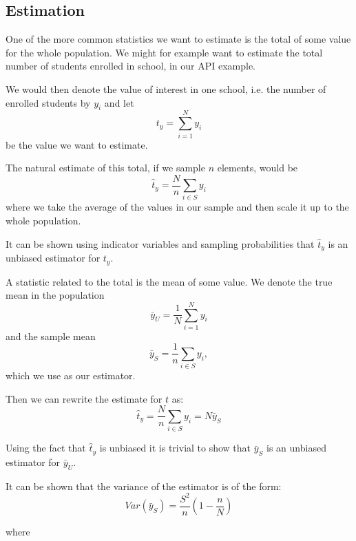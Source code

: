 \documentclass{article}
\begin{document}
\subsection{Estimation}

One of the more common statistics we want to estimate is the total of some value
for the whole population. We might for example want to estimate the total number
of students enrolled in school, in our API example.

We would then denote the value of interest in one school, i.e. the number of
enrolled students by \(y_i\) and let
\begin{equation*}
  t_y = \sum_{i = 1}^{N} y_i
\end{equation*}
be the value we want to estimate.

The natural estimate of this total, if we sample \(n\) elements, would be
\begin{equation*}
\hat{t}_y = \frac{N}{n}\sum_{i \in S} y_i
\end{equation*}
where we take the average of the values in our sample and then scale it up to
the whole population.

It can be shown using indicator variables and sampling probabilities that
\(\hat{t}_y\) is an unbiased estimator for \(t_y\).


A statistic related to the total is the mean of some value. We denote the true
mean in the population
\begin{equation*}
\bar{y}_U = \frac{1}{N} \sum_{i = 1}^{N} y_i
\end{equation*}
and the sample mean
\begin{equation*}
\bar{y}_S = \frac{1}{n} \sum_{i \in S} y_i ,
\end{equation*}
which we use as our estimator.

Then we can rewrite the estimate for \(t\) as:
\begin{equation*}
\hat{t}_y = \frac{N}{n} \sum_{i \in S} y_i = N\bar{y}_S
\end{equation*}

Using the fact that \(\hat{t}_y\) is unbiased it is trivial to show that
\(\bar{y}_S\) is an unbiased estimator for \(\bar{y}_U\).

It can be shown that the variance of the estimator is of the form:
\begin{equation*}
Var \left( \bar{y}_S \right) = \frac{S^2}{n} \left( 1 - \frac{n}{N}
\right)
\end{equation*}

where
\end{document}
